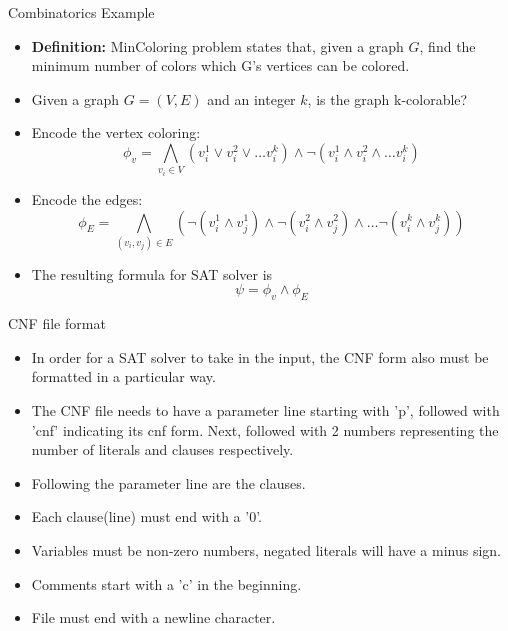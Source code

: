 \documentclass{beamer}
\begin{document}
\begin{frame}[t]{Combinatorics Example}

	\begin{itemize}
		\item \textbf{Definition:} MinColoring problem states that, given a graph $G$, find the minimum number of colors which G's vertices can be colored.  
		\item Given a graph $G = (V,E)$ and an integer $k$, is the graph k-colorable? 
		\item Encode the vertex coloring: 
		$$\phi_v = \bigwedge_{v_i \in V} (v_{i}^1 \vee v_{i}^2 \vee \dots v_{i}^k) \wedge \neg (v_{i}^1 \wedge v_{i}^2 \wedge \dots v_{i}^k)$$
		\item Encode the edges: 
		$$\phi_E = \bigwedge_{(v_i, v_j) \in E} (\neg (v_{i}^1 \wedge v_{j}^1) \wedge \neg (v_{i}^2 \wedge v_{j}^2) \wedge \dots \neg (v_{i}^k \wedge v_{j}^k))$$
		\item The resulting formula for SAT solver is 
		$$\psi = \phi_v \wedge \phi_E$$
	\end{itemize}

\end{frame}

\begin{frame}{CNF file format}
	\begin{itemize}
		\item In order for a SAT solver to take in the input, the CNF form also must be formatted in a particular way. 
		\item The CNF file needs to have a parameter line starting with 'p', followed with 'cnf' indicating its cnf form. Next, followed with 2 numbers representing the number of literals and clauses respectively. 
		\item Following the parameter line are the clauses.
		\item Each clause(line) must end with a '0'.
		\item Variables must be non-zero numbers, negated literals will have a minus sign. 
		\item Comments start with a 'c' in the beginning. 
		\item File must end with a newline character.
	\end{itemize}

\end{frame}
\end{document}
